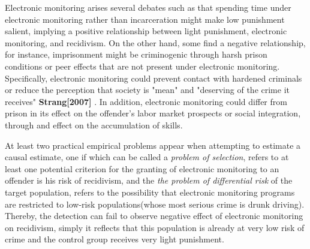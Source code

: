 \documentclass[a4paper,12pt]{article}
\begin{document}
Electronic monitoring arises several debates such as that spending time under electronic monitoring rather than incarceration might make low punishment salient, implying a positive relationship between light punishment, electronic monitoring, and recidivism. On the other hand, some find a negative relationship, for instance, imprisonment might be criminogenic through harsh prison conditions or peer effects that are not present under electronic monitoring. Specifically, electronic monitoring could prevent contact with hardened criminals or reduce the perception that society is "mean" and "deserving of the crime it receives" \textbf{Strang[2007]} \cite{article}. In addition, electronic monitoring could differ from prison in its effect on the offender's labor market prospects or social integration, through and effect on the accumulation of skills. 

At least two practical empirical problems appear when attempting to estimate a causal estimate, one if which can be called a \textit{problem of selection}, refers to at least one potential criterion for the granting of electronic monitoring to an offender is his risk of recidivism,  and the \textit{the problem of differential risk} of the target population, refers to the possibility that electronic monitoring programs are restricted to low-risk populations(whose most serious crime is drunk driving). Thereby, the detection can fail to observe negative effect of electronic monitoring on recidivism, simply it reflects that this population is already at very low risk of crime and the control group receives very light punishment.  
\end{document}
